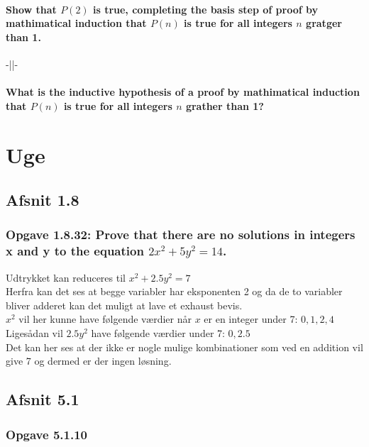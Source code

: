 \documentclass[12pt, a4paper]{report}
\begin{document}
				\subsubsection{Show that $P(2)$ is true, completing the basis step of proof by mathimatical induction that $P(n)$ is true for all integers $n$ gratger than 1.}
				-||-
				\subsubsection{What is the inductive hypothesis of a proof by mathimatical induction that $P(n)$ is true for all integers $n$ grather than 1?}
	\chapter{Uge}
		\section{Afsnit 1.8}
			\setcounter{subsection}{31}
			\subsection{ Opgave 1.8.32: Prove that there are no solutions in integers x and y to the equation $2x^2 + 5y^2 = 14$.}
				Udtrykket kan reduceres til $x^2+2.5y^2=7$\\
				Herfra kan det ses at begge variabler har eksponenten 2 og da de to variabler bliver adderet kan det muligt at lave et exhaust bevis.\\
				$x^2$ vil her kunne have følgende værdier når $x$ er en integer under 7: $0,1,2,4$\\
				Ligesådan vil $2.5y^2$ have følgende værdier under 7: $0,2.5$\\
				Det kan her ses at der ikke er nogle mulige kombinationer som ved en addition vil give 7 og dermed er der ingen løsning.
		\section{Afsnit 5.1}
			\setcounter{subsection}{9}
			\subsection{Opgave 5.1.10}
\end{document}
